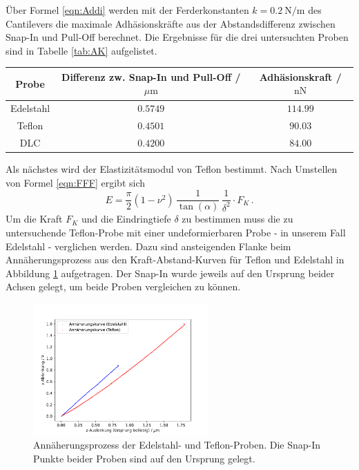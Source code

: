         Über Formel \ref{eqn:Addi} werden mit der Ferderkonstanten $k=\SI{0.2}{\newton\per\metre}$ des Cantilevers die maximale Adhäsionskräfte aus der Abstandsdifferenz  zwischen Snap-In und Pull-Off berechnet. Die Ergebnisse für die drei untersuchten Proben sind in Tabelle \ref{tab:AK} aufgelistet.
        \begin{center}
            \label{tab:AK}
            \begin{tabular}{c c c}
                \toprule
                Probe & Differenz zw. Snap-In und Pull-Off / $\mu\text{m}$ & Adhäsionskraft / $\text{nN}$ \\
                \midrule
                Edelstahl & $0.5749$ & $114.99$\\
                Teflon    & $0.4501$ & $90.03$ \\
                DLC       & $0.4200$ & $84.00$ \\
                \bottomrule
            \end{tabular}
        \end{center}
        Als nächstes wird der Elastizitätsmodul von Teflon bestimmt. Nach Umstellen von Formel \ref{eqn:FFF} ergibt sich
        \begin{equation}
            E = \frac{\pi}{2}\left(1-\nu^2\right)\,\frac{1}{\tan(\alpha)}\,\frac{1}{\delta^2}\cdot F_K \, .
            \label{eqn:EEE}
        \end{equation}
        Um die Kraft $F_K$ und die Eindringtiefe $\delta$ zu bestimmen muss die zu untersuchende Teflon-Probe mit einer undeformierbaren Probe - in unserem Fall Edelstahl - verglichen werden. Dazu sind ansteigenden Flanke beim Annäherungsprozess aus den Kraft-Abstand-Kurven für Teflon und Edelstahl in Abbildung \ref{fig:Ela} aufgetragen. Der Snap-In wurde jeweils auf den Ursprung beider Achsen gelegt, um beide Proben vergleichen zu können.
        \begin{figure}
            \centering
            \includegraphics[width = 0.60\textwidth]{pictures/Ursprung.pdf}
            \caption{Annäherungsprozess der Edelstahl- und Teflon-Proben. Die Snap-In Punkte beider Proben sind auf den Ursprung gelegt.}
            \label{fig:Ela}
        \end{figure}
